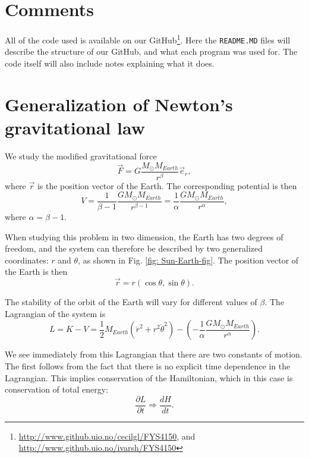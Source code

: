 \documentclass[%
 reprint,
nofootinbib,
aps,
]{revtex4-1}
\begin{document}
\section{Comments}
All of the code used is available on our GitHub\footnote{\url{http://www.github.uio.no/cecilgl/FYS4150}, and \url{http://www.github.uio.no/ivarsh/FYS4150}}. Here the \texttt{README.MD} files will describe the structure of our GitHub, and what each program was used for. The code itself will also include notes explaining what it does.

\appendix

\section{Generalization of Newton's gravitational law} \label{eom}


We study the modified gravitational force
\begin{equation}
\vec{F} = G\frac{M_\odot M_{Earth}}{r^\beta}\vec{e}_r,
\end{equation}
where $\vec{r}$ is the position vector of the Earth. The corresponding potential is then
\begin{equation}
V = \frac{1}{\beta - 1}\frac{GM_\odot M_{Earth}}{r^{\beta - 1}} = \frac{1}{\alpha}\frac{GM_\odot M_{Earth}}{r^{\alpha}},
\end{equation}
where $\alpha = \beta -1$.


When studying this problem in two dimension, the Earth has two degrees of freedom, and the system can therefore be described by two generalized coordinates: $r$ and $\theta$, as shown in Fig. \vref{fig: Sun-Earth-fig}. The position vector of the Earth is then
\begin{equation}
\vec{r} = r(\cos\theta, \sin\theta).
\end{equation}

The stability of the orbit of the Earth will vary for different values of $\beta$. The Lagrangian of the system is
\begin{equation}
L = K - V = \frac{1}{2}M_{Earth}\left(\dot{r}^2 + r^2\dot{\theta}^2\right) - \left(-\frac{1}{\alpha}\frac{GM_\odot M_{Earth}}{r^\alpha}\right).
\end{equation}

We see immediately from this Lagrangian that there are two constants of motion. The first follows from the fact that there is no explicit time dependence in the Lagrangian. This implies conservation of the Hamiltonian, which in this case is conservation of total energy:
\begin{equation}
\frac{\partial L}{\partial t} \Rightarrow \frac{dH}{dt}.
\end{equation}
\end{document}
